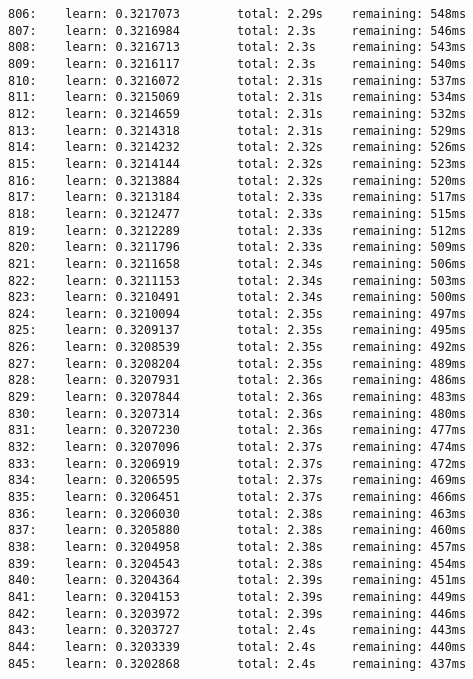 \documentclass[11pt]{article}
\begin{document}
\begin{Verbatim}[commandchars=\\\{\}]
806:    learn: 0.3217073        total: 2.29s    remaining: 548ms
807:    learn: 0.3216984        total: 2.3s     remaining: 546ms
808:    learn: 0.3216713        total: 2.3s     remaining: 543ms
809:    learn: 0.3216117        total: 2.3s     remaining: 540ms
810:    learn: 0.3216072        total: 2.31s    remaining: 537ms
811:    learn: 0.3215069        total: 2.31s    remaining: 534ms
812:    learn: 0.3214659        total: 2.31s    remaining: 532ms
813:    learn: 0.3214318        total: 2.31s    remaining: 529ms
814:    learn: 0.3214232        total: 2.32s    remaining: 526ms
815:    learn: 0.3214144        total: 2.32s    remaining: 523ms
816:    learn: 0.3213884        total: 2.32s    remaining: 520ms
817:    learn: 0.3213184        total: 2.33s    remaining: 517ms
818:    learn: 0.3212477        total: 2.33s    remaining: 515ms
819:    learn: 0.3212289        total: 2.33s    remaining: 512ms
820:    learn: 0.3211796        total: 2.33s    remaining: 509ms
821:    learn: 0.3211658        total: 2.34s    remaining: 506ms
822:    learn: 0.3211153        total: 2.34s    remaining: 503ms
823:    learn: 0.3210491        total: 2.34s    remaining: 500ms
824:    learn: 0.3210094        total: 2.35s    remaining: 497ms
825:    learn: 0.3209137        total: 2.35s    remaining: 495ms
826:    learn: 0.3208539        total: 2.35s    remaining: 492ms
827:    learn: 0.3208204        total: 2.35s    remaining: 489ms
828:    learn: 0.3207931        total: 2.36s    remaining: 486ms
829:    learn: 0.3207844        total: 2.36s    remaining: 483ms
830:    learn: 0.3207314        total: 2.36s    remaining: 480ms
831:    learn: 0.3207230        total: 2.36s    remaining: 477ms
832:    learn: 0.3207096        total: 2.37s    remaining: 474ms
833:    learn: 0.3206919        total: 2.37s    remaining: 472ms
834:    learn: 0.3206595        total: 2.37s    remaining: 469ms
835:    learn: 0.3206451        total: 2.37s    remaining: 466ms
836:    learn: 0.3206030        total: 2.38s    remaining: 463ms
837:    learn: 0.3205880        total: 2.38s    remaining: 460ms
838:    learn: 0.3204958        total: 2.38s    remaining: 457ms
839:    learn: 0.3204543        total: 2.38s    remaining: 454ms
840:    learn: 0.3204364        total: 2.39s    remaining: 451ms
841:    learn: 0.3204153        total: 2.39s    remaining: 449ms
842:    learn: 0.3203972        total: 2.39s    remaining: 446ms
843:    learn: 0.3203727        total: 2.4s     remaining: 443ms
844:    learn: 0.3203339        total: 2.4s     remaining: 440ms
845:    learn: 0.3202868        total: 2.4s     remaining: 437ms

\end{Verbatim}
\end{document}
